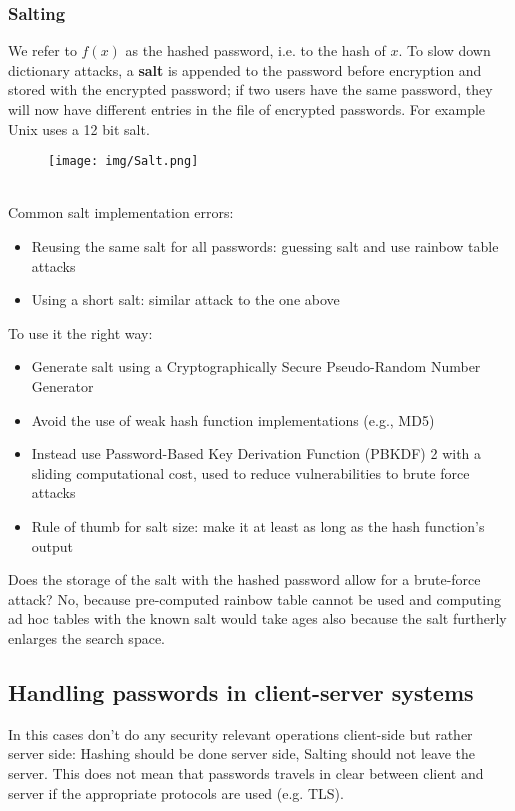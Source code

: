 \documentclass[a4paper, 10pt, titlepage]{article}
\begin{document}
\subsubsection{Salting}
We refer to $f(x)$ as the hashed password, i.e. to the hash of $x$. To slow down dictionary attacks, a \textbf{salt} is appended to the password before encryption and stored with the encrypted password; if two users have the same password, they will now have different entries in the file of encrypted passwords. For example Unix uses a 12 bit salt.
\begin{figure}[h]
\centering
\texttt{[image: img/Salt.png]}
\end{figure}\\
Common salt implementation errors:
\begin{itemize}
\item Reusing the same salt for all passwords: guessing salt and use rainbow table attacks
\item Using a short salt: similar attack to the one above
\end{itemize}
To use it the right way:
\begin{itemize}
\item Generate salt using a Cryptographically Secure Pseudo-Random Number Generator
\item Avoid the use of weak hash function implementations (e.g., MD5)
\item Instead use Password-Based Key Derivation Function (PBKDF) 2 with a sliding computational cost, used to reduce vulnerabilities to brute force attacks
\item Rule of thumb for salt size: make it at least as long as the hash function's output
\end{itemize}
Does the storage of the salt with the hashed password allow for a brute-force attack? No, because pre-computed rainbow table cannot
be used and computing ad hoc tables with the known salt would take ages also because the salt furtherly enlarges the search space.

\subsection{Handling passwords in client-server systems}
In this cases don’t do any security relevant operations client-side but rather server side: Hashing should be done server side, Salting should not leave the server. This does not mean that passwords travels in clear between client and server if the appropriate protocols are used (e.g. TLS).
\end{document}
